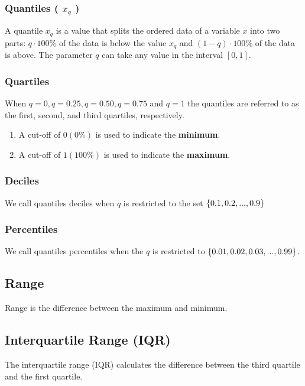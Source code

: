 \subsubsection{Quantiles ( $x_q$ ) \cite{ism-1}}\label{Quantiles}
A quantile $x_q$ is a value that splits the ordered data of a variable $x$ into two parts: $q \cdot 100\%$ of the data is below the value $x_q$ and $(1 - q) \cdot 100\%$ of the data is above. The parameter $q$ can take any value in the interval $[0, 1]$.

\subsubsection{Quartiles \cite{ism-1}}\label{Quartiles}
When $q = 0, q = 0.25, q = 0.50, q = 0.75$ and $q = 1$ the quantiles are referred to as the first, second, and third quartiles, respectively.
\begin{enumerate}
    \item A cut-off of $0 (0\%)$ is used to indicate the \textbf{minimum}.
    \item A cut-off of $1 (100\%)$ is used to indicate the \textbf{maximum}.
\end{enumerate}

\subsubsection{Deciles \cite{ism-1}}\label{Deciles}
We call quantiles deciles when $q$ is restricted to the set $\left\{0.1, 0.2, ... , 0.9\right\}$

\subsubsection{Percentiles \cite{ism-1}}\label{Percentiles}
We call quantiles percentiles when the $q$ is restricted to $\left\{0.01, 0.02, 0.03, ... , 0.99\right\}$.

\subsection{Range \cite{ism-1}}\label{Range}
Range is the difference between the maximum and minimum.

\subsection{Interquartile Range (IQR) \cite{ism-1}}\label{Interquartile Range (IQR)}
The interquartile range (IQR) calculates the difference between the third quartile and the first quartile.

